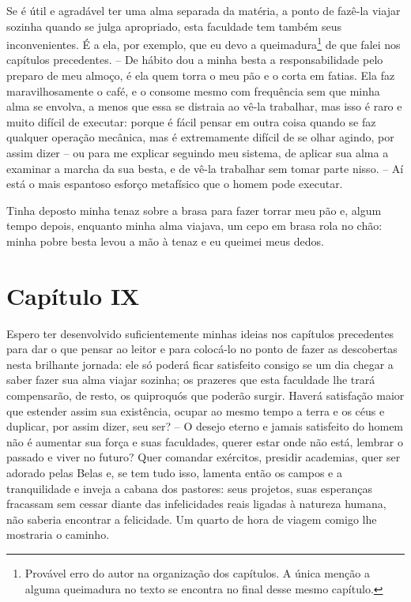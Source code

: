  Se é útil e agradável ter uma alma separada da matéria, a ponto de
fazê-la viajar sozinha quando se julga apropriado, esta faculdade tem
também seus inconvenientes. É a ela, por exemplo, que eu devo a
queimadura\footnote{Provável erro do autor na organização dos capítulos. A única menção a alguma queimadura no texto se encontra no final desse mesmo capítulo.}  
de que falei nos capítulos precedentes. -- De hábito dou a                         
minha besta a responsabilidade pelo preparo de meu almoço, é ela quem												
torra o meu pão e o corta em fatias. Ela faz maravilhosamente o café, e
o consome mesmo com frequência sem que minha alma se envolva, a menos
que essa se distraia ao vê-la trabalhar, mas isso é raro e muito
difícil de executar: porque é fácil pensar em outra coisa quando se faz
qualquer operação mecânica, mas é extremamente difícil de se olhar
agindo, por assim dizer -- ou para me explicar seguindo meu sistema,
de aplicar sua alma a examinar a marcha da sua besta, e de vê-la
trabalhar sem tomar parte nisso. -- Aí está o mais espantoso esforço
metafísico que o homem pode executar.

 Tinha deposto minha tenaz sobre a brasa para fazer torrar meu pão e,
algum tempo depois, enquanto minha alma viajava, um cepo em brasa rola
no chão: minha pobre besta levou a mão à tenaz e eu queimei meus dedos.

\section*{Capítulo IX}

 Espero ter desenvolvido suficientemente minhas ideias nos capítulos
precedentes para dar o que pensar ao leitor e para colocá-lo no ponto
de fazer as descobertas nesta brilhante jornada: ele só poderá ficar
satisfeito consigo se um dia chegar a saber fazer sua alma viajar
sozinha; os prazeres que esta faculdade lhe trará compensarão, de
resto, os quiproquós que poderão surgir. Haverá satisfação maior que
estender assim sua existência, ocupar ao mesmo tempo a terra e os céus
e duplicar, por assim dizer, seu ser? -- O desejo eterno e jamais
satisfeito do homem não é aumentar sua força e suas faculdades, querer
estar onde não está, lembrar o passado e viver no futuro? Quer comandar
exércitos, presidir academias, quer ser adorado pelas Belas e, se tem
tudo isso, lamenta então os campos e a tranquilidade e inveja a cabana
dos pastores: seus projetos, suas esperanças fracassam sem cessar
diante das infelicidades reais ligadas à natureza humana, não saberia
encontrar a felicidade. Um quarto de hora de viagem comigo lhe
mostraria o caminho.

